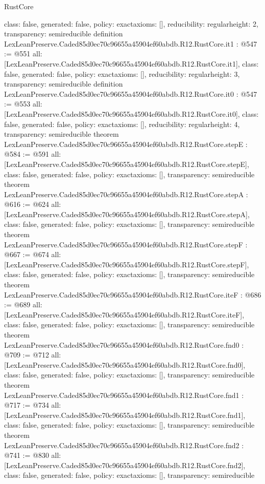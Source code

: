 \begin{lexlean}{RustCore}
\begin{coremodule}
{  class: false,
  generated: false,
  policy: exact{axioms: []},
  reducibility: regular{height: 2},
  transparency: semireducible
}
definition LexLeanPreserve.Caded85d0ec70c96655a45904ef60abdb.R12.RustCore.it1 : @547 := @551 {
  all: [LexLeanPreserve.Caded85d0ec70c96655a45904ef60abdb.R12.RustCore.it1],
  class: false,
  generated: false,
  policy: exact{axioms: []},
  reducibility: regular{height: 3},
  transparency: semireducible
}
definition LexLeanPreserve.Caded85d0ec70c96655a45904ef60abdb.R12.RustCore.it0 : @547 := @553 {
  all: [LexLeanPreserve.Caded85d0ec70c96655a45904ef60abdb.R12.RustCore.it0],
  class: false,
  generated: false,
  policy: exact{axioms: []},
  reducibility: regular{height: 4},
  transparency: semireducible
}
theorem LexLeanPreserve.Caded85d0ec70c96655a45904ef60abdb.R12.RustCore.stepE : @584 := @591 {
  all: [LexLeanPreserve.Caded85d0ec70c96655a45904ef60abdb.R12.RustCore.stepE],
  class: false,
  generated: false,
  policy: exact{axioms: []},
  transparency: semireducible
}
theorem LexLeanPreserve.Caded85d0ec70c96655a45904ef60abdb.R12.RustCore.stepA : @616 := @624 {
  all: [LexLeanPreserve.Caded85d0ec70c96655a45904ef60abdb.R12.RustCore.stepA],
  class: false,
  generated: false,
  policy: exact{axioms: []},
  transparency: semireducible
}
theorem LexLeanPreserve.Caded85d0ec70c96655a45904ef60abdb.R12.RustCore.stepF : @667 := @674 {
  all: [LexLeanPreserve.Caded85d0ec70c96655a45904ef60abdb.R12.RustCore.stepF],
  class: false,
  generated: false,
  policy: exact{axioms: []},
  transparency: semireducible
}
theorem LexLeanPreserve.Caded85d0ec70c96655a45904ef60abdb.R12.RustCore.iteF : @686 := @689 {
  all: [LexLeanPreserve.Caded85d0ec70c96655a45904ef60abdb.R12.RustCore.iteF],
  class: false,
  generated: false,
  policy: exact{axioms: []},
  transparency: semireducible
}
theorem LexLeanPreserve.Caded85d0ec70c96655a45904ef60abdb.R12.RustCore.fnd0 : @709 := @712 {
  all: [LexLeanPreserve.Caded85d0ec70c96655a45904ef60abdb.R12.RustCore.fnd0],
  class: false,
  generated: false,
  policy: exact{axioms: []},
  transparency: semireducible
}
theorem LexLeanPreserve.Caded85d0ec70c96655a45904ef60abdb.R12.RustCore.fnd1 : @717 := @734 {
  all: [LexLeanPreserve.Caded85d0ec70c96655a45904ef60abdb.R12.RustCore.fnd1],
  class: false,
  generated: false,
  policy: exact{axioms: []},
  transparency: semireducible
}
theorem LexLeanPreserve.Caded85d0ec70c96655a45904ef60abdb.R12.RustCore.fnd2 : @741 := @830 {
  all: [LexLeanPreserve.Caded85d0ec70c96655a45904ef60abdb.R12.RustCore.fnd2],
  class: false,
  generated: false,
  policy: exact{axioms: []},
  transparency: semireducible
}
\end{coremodule}
\end{lexlean}
